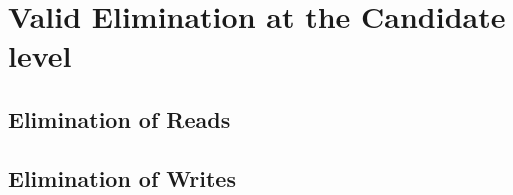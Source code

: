 \section{Valid Elimination at the Candidate level}

    \subsection{Elimination of Reads}
        

    \subsection{Elimination of Writes}
        
    